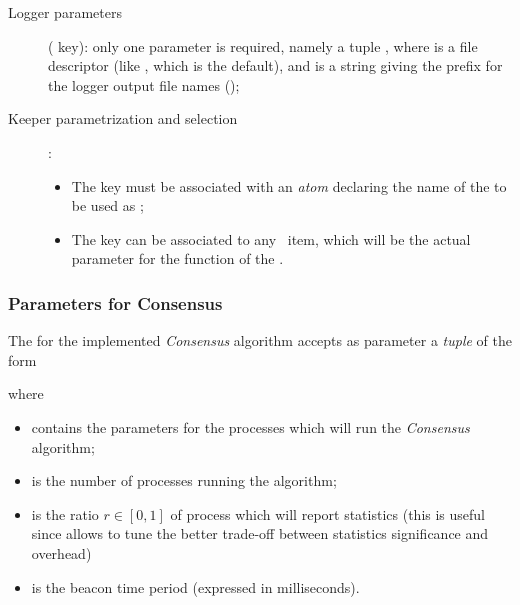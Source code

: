 \begin{description}
\begin{itemize}
    \end{itemize}

    \item[Logger parameters] ( key): only one parameter is
        required, namely a tuple , where
         is a file descriptor (like ,
        which is the default), and  is a string giving
        the prefix for the logger output file names
        ();

    \item[Keeper parametrization and selection]:
    \begin{itemize}
        \item   The  key must be associated with an
                \emph{atom} declaring the name of the  to be used as ;
        
        \item   The  key can be associated to any
                \Erlang\ item, which will be the actual parameter for the
                 function of the .
    \end{itemize}

\end{description}

\subsubsection{Parameters for Consensus}

    The  for the implemented \emph{Consensus}
    algorithm accepts as parameter a \emph{tuple} of the form
    \begin{quote}
    \end{quote}
    where
    \begin{itemize}
    \item   {} contains the parameters for the processes
            which will run the \emph{Consensus} algorithm;
    \item   {} is the number of processes running the
            algorithm;
    \item   {} is the ratio $r \in [0, 1]$ of process which
            will report statistics (this is useful since allows to tune
            the better trade-off between statistics significance and
            overhead)
    \item   {} is the beacon time period (expressed in
            milliseconds).
    \end{itemize}

